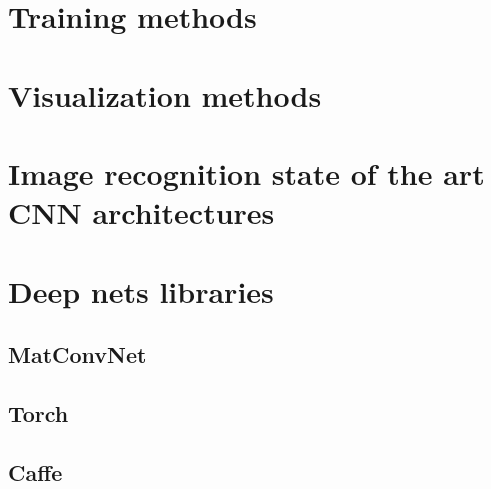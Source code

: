 \documentclass{report}
\begin{document}
\chapter{Training methods}


\chapter{Visualization methods}


\chapter{Image recognition state of the art CNN architectures}




\chapter{Deep nets libraries}
\label{lib}

\section{MatConvNet}


\section{Torch}


\section{Caffe}





	


\end{document}
